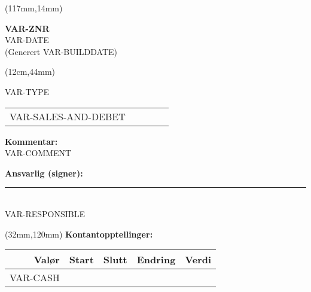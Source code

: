 \documentclass[a4paper, 12pt]{article}
\begin{document}
\begin{textblock*}{47mm}(117mm,14mm)
    \begin{center}
        \Large
        \textbf{VAR-ZNR}
        \normalsize
        \\[1mm]
        VAR-DATE
        \\[1mm]
        \scriptsize{(Generert VAR-BUILDDATE)}
    \end{center}
\end{textblock*}


\begin{textblock*}{8cm}(12cm,44mm)
   

    VAR-TYPE



    \vspace{5mm}


    \begin{tabularx}{\textwidth}{rcrrX}
        VAR-SALES-AND-DEBET
    \end{tabularx}
    \vspace{5mm}


    \textbf{Kommentar:} \\
VAR-COMMENT


    \vspace{8mm}
    \textbf{Ansvarlig (signer):} \\[8mm]
    \rule{5cm}{0.5pt} \\
    VAR-RESPONSIBLE

\end{textblock*}

\begin{textblock*}{71mm}(32mm,120mm)
    \textbf{Kontantopptellinger:} \\[3mm]
    \begin{tabular}{rrrrr}
        Valør & Start & Slutt & Endring & Verdi \\
        \hline
        VAR-CASH
    \end{tabular}
\end{textblock*}
\end{document}
